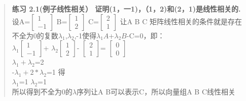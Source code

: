\documentclass[UTF8,12pt]{article}
\begin{document}
\begin{CJK}{UTF8}{gbsn}
\begin{quote}
{\bf 练习 2.1(例子线性相关） 证明(1，一1)，（1，2)和(2，1)是线性相关的.}\\
  设A=$\begin{bmatrix}1\\-1\end{bmatrix}$
B=$\begin{bmatrix}1\\2\end{bmatrix}$
C=$\begin{bmatrix}2\\1\end{bmatrix}$
让A B C 矩阵线性相关的条件就是存在不全为0的复数$\lambda_1$,$\lambda_2$,-1使得$\lambda_1A$+$\lambda_2B$-C=0，即：\\
$\lambda_1\begin{bmatrix}1\\-1\end{bmatrix}$+
$\lambda_2\begin{bmatrix}1\\2\end{bmatrix}$-
$\begin{bmatrix}2\\1\end{bmatrix}$=
$\begin{bmatrix}0\\0\end{bmatrix}$\\
$\lambda_1+\lambda_2$=2\\
-$\lambda_1+2*\lambda_2$=1    得\\
$\lambda_1$=1
$\lambda_2$=1\\
所以得到不全为0的$\lambda$序列让A B可以表示C，所以向量组A B C线性相关
\end{quote}

\end{CJK}
\end{document}
